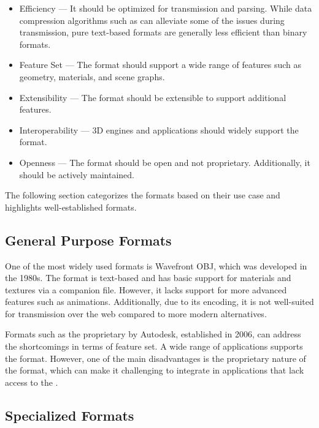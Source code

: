 \begin{itemize}
  \item{Efficiency} — It should be optimized for transmission and parsing. While data compression algorithms such as  can alleviate some of the issues during transmission, pure text-based formats are generally less efficient than binary formats.
  \item{Feature Set} — The format should support a wide range of features such as geometry, materials, and scene graphs.
  \item{Extensibility} — The format should be extensible to support additional features.
  \item{Interoperability} — 3D engines and applications should widely support the format.
  \item{Openness} — The format should be open and not proprietary. Additionally, it should be actively maintained.
\end{itemize}

The following section categorizes the formats based on their use case and highlights well-established formats.

\subsection*{General Purpose Formats}

One of the most widely used formats is Wavefront \gls{OBJ}, which was developed in the 1980s. The format is text-based and has basic support for materials and textures via a companion  file. However, it lacks support for more advanced features such as animations. Additionally, due to its encoding, it is not well-suited for transmission over the web compared to more modern alternatives.

Formats such as the proprietary  by Autodesk, established in 2006, can address the shortcomings in terms of feature set. A wide range of applications supports the format. However, one of the main disadvantages is the proprietary nature of the format, which can make it challenging to integrate in applications that lack access to the .

\subsection*{Specialized Formats}
\label{ch:specializedFormats}

